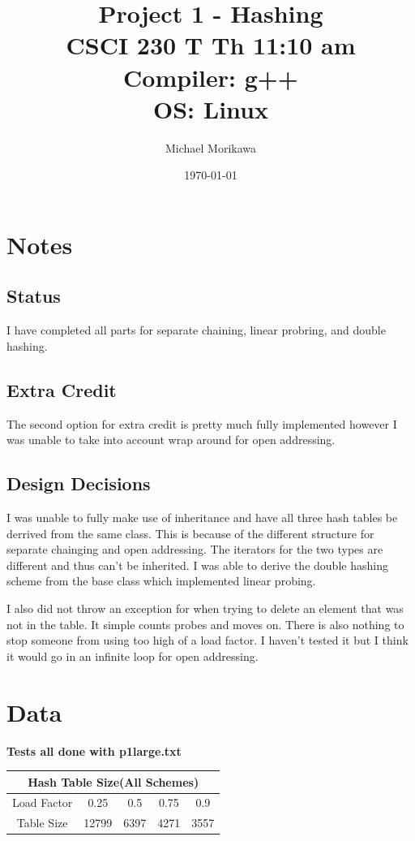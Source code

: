 \documentclass[titlepage]{article}
\title{
    Project 1 - Hashing \\
    CSCI 230 T Th 11:10 am \\
    Compiler: g++ \\
    OS: Linux
    }
\author{Michael Morikawa}
\date{\today}
\begin{document}
\maketitle

\section{Notes}
\subsection{Status}
I have completed all parts for separate chaining, linear probring, 
and double hashing. 
\subsection{Extra Credit}
 The second option for extra credit is pretty much fully implemented 
 however I was unable to take into account wrap around for open 
 addressing.
\subsection{Design Decisions}
I was unable to fully make use of inheritance and have all 
three hash tables be derrived from the same class. This 
is because of the different structure for separate chainging 
and open addressing. The iterators for the two types are different
 and thus can't be inherited. I was able to derive the double hashing 
 scheme from the base class which implemented linear probing.

 I also did not throw an exception for when trying to delete an 
 element that was not in the table. It simple counts probes and 
 moves on. There is also nothing to stop someone from using 
 too high of a load factor. I haven't tested it but I 
 think it would go in an infinite loop for open addressing.

 \newpage

 \section{Data}
 \textbf{Tests all done with p1large.txt}
\vspace{5mm}

\begin{tabular}{ |c|c|c|c|c| } 
\hline
\multicolumn{5}{|c|}{Hash Table Size(All Schemes)}\\
\hline
Load Factor & 0.25 & 0.5 & 0.75 & 0.9 \\
\hline
Table Size & 12799 & 6397 & 4271 & 3557 \\
\hline
\end{tabular}
\end{document}
